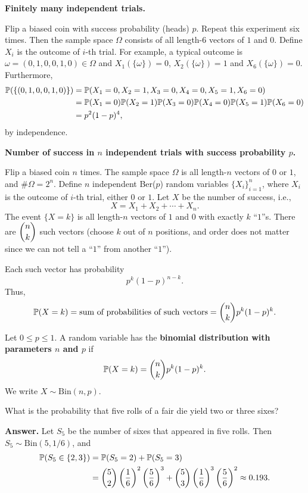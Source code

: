 \textbf{Finitely many independent trials.}
\begin{example}
  Flip a biased coin with success probability (heads) $p$. Repeat this
  experiment six times. Then the sample space $\Omega$ consists of all
  length-$6$ vectors of $1$ and $0$. Define $X_i$ is the outcome of $i$-th
  trial. For example, a typical outcome is $\omega = (0,1,0,0,1,0)\in \Omega$ and
  $X_1(\{\omega\}) = 0$, $X_2(\{\omega\}) = 1$ and $X_6(\{\omega\}) = 0$.
  Furthermore,
  \begin{align*}
    \mathbb{P}(\{(0,1,0,0,1,0)\}) & = \mathbb{P}(X_1 =0, X_2 =1, X_3 = 0, X_4 =0, X_5 =1, X_6 =0)\\
                           & = \mathbb{P}(X_1 = 0)\mathbb{P}(X_2 = 1)\mathbb{P}(X_3 = 0)\mathbb{P}(X_4 = 0)\mathbb{P}(X_5 = 1)\mathbb{P}(X_6 = 0)\\
    & = p^2(1-p)^4,
  \end{align*}
  by independence.
\end{example}
\textbf{Number of success in $n$ independent trials with success probability $p$.}
\begin{example}
  Flip a biased coin $n$ times. The sample space $\Omega$ is all length-$n$
  vectors of $0$ or $1$, and $\# \Omega = 2^n$. Define $n$ independent Ber($p$) random variables
  $\{X_i\}_{i=1}^n$, where $X_i$ is the outcome of $i$-th trial, either $0$ or $1$. Let $X$ be the
  number of success, i.e.,
  \[
    X = X_1 + X_2+\cdots + X_n.
  \]
  The event $\{X = k\}$ is all length-$n$ vectors of $1$ and $0$ with exactly
  $k$ ``$1$''s. There are $\displaystyle \binom{n}{k}$ such vectors (choose $k$ out of $n$
  positions, and order does not matter since we can not tell a ``$1$'' from
  another ``$1$'').

  Each such vector has probability
  \[
    p^k(1-p)^{n-k}.
  \]
  Thus,
  \[
    \mathbb{P}(X = k) = \text{sum of probabilities of such vectors} = \binom{n}{k}p^k(1-p)^k.
  \]
\end{example}
\begin{definition}
  Let $0\le p\le 1$. A random variable has the \textbf{binomial distribution
    with parameters $n$ and $p$} if
  \[
    \mathbb{P}(X = k) = \binom{n}{k}p^k(1-p)^k.
  \]
  We write $X\sim\text{Bin}(n,p)$.
\end{definition}
\begin{example}
  What is the probability that five rolls of a fair die yield two or three sixes?
\end{example}
\textbf{Answer.} Let $S_5$ be the number of sixes that appeared in five rolls.
Then $S_5\sim\text{Bin}(5,1/6)$, and
\begin{align*}
  \mathbb{P}(S_5\in\{2,3\}) & = \mathbb{P}(S_5 = 2) + \mathbb{P}(S_5=3)\\
                     & = \binom{5}{2}\left(\frac{1}{6}\right)^2\left(\frac{5}{6}\right)^3 + \binom{5}{3}\left(\frac{1}{6}\right)^3\left(\frac{5}{6}\right)^2 \approx 0.193.
\end{align*}

